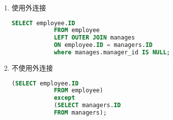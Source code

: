 \documentclass{article}
\begin{document}
	\begin{enumerate}[noitemsep, label={{\arabic*})}]
		\item 使用外连接
		
		\begin{lstlisting}[language=sql, title=4.18-1 解答, tabsize=2]
		    SELECT employee.ID
		    FROM employee
		    LEFT OUTER JOIN manages
		    ON employee.ID = managers.ID
		    where manages.manager_id IS NULL;
		\end{lstlisting}
		
		\item 不使用外连接
		
		\begin{lstlisting}[language=sql, title=4.18-1 解答, tabsize=2]
		    (SELECT employee.ID
		    FROM employee)
		    except
		    (SELECT managers.ID
		    FROM managers);
		\end{lstlisting}
	\end{enumerate}\textbf{}
	
\end{document}
